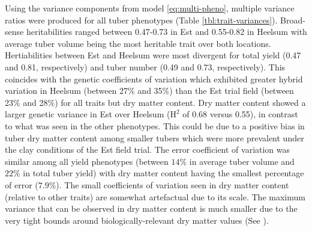 Using the variance components from model \ref{eq:multi-pheno}, multiple variance ratios were produced for all tuber phenotypes (Table \ref{tbl:trait-variances}). Broad-sense heritabilities ranged between 0.47-0.73 in Est and 0.55-0.82 in Heelsum with average tuber volume being the most heritable trait over both locations. Hertiabilities between Est and Heelsum were most divergent for total yield (0.47 and 0.81, respectively) and tuber number (0.49 and 0.73, respectively). This coincides with the genetic coefficients of variation which exhibited greater hybrid variation in Heelsum (between 27\% and 35\%) than the Est trial field (between 23\% and 28\%) for all traits but dry matter content. Dry matter content showed a larger genetic variance in Est over Heelsum (\(\mathrm H^2\) of 0.68 versus 0.55), in contrast to what was seen in the other phenotypes. This could be due to a positive bias in tuber dry matter content among smaller tubers which were more prevalent under the clay conditions of the Est field trial. The error coefficient of variation was similar among all yield phenotypes (between \(14\%\) in average tuber volume and \(22\%\) in total tuber yield) with dry matter content having the smallest percentage of error (\(7.9\%\)). The small coefficients of variation seen in dry matter content (relative to other traits) are somewhat artefactual due to its scale. The maximum variance that can be observed in dry matter content is much smaller due to the very tight bounds around biologically-relevant dry matter values (See \citet{Bhatia2000}).

